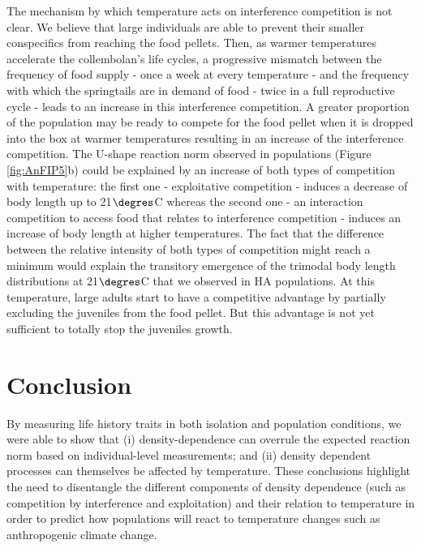 The mechanism by which temperature acts on interference competition is not
clear. We believe that large individuals are able to prevent their smaller
conspecifics from reaching the food pellets. Then, as warmer temperatures
accelerate the collembolan’s life cycles, a progressive mismatch between the
frequency of food supply - once a week at every temperature - and the frequency
with which the springtails are in demand of food - twice in a full reproductive
cycle \autocites{palevody1974a} - leads to an increase in this
interference competition.
A greater proportion of the population may be ready to compete for the food pellet
when it is dropped into the box at warmer temperatures resulting in an increase
of the interference competition. The U-shape reaction norm observed in
populations (Figure \ref{fig:AnFIP5}b) could be explained by an increase of both
types of competition with temperature: the first one - exploitative competition - induces
a decrease of body length up to 21$\degres$C whereas the second one - an interaction
competition to access food that relates to interference competition - induces an
increase of body length at higher temperatures. The fact that the difference
between the relative intensity of both types of competition might reach a
minimum would explain the transitory emergence of the trimodal body length
distributions at 21$\degres$C that we observed in HA populations. At this
temperature,
large adults start to have a competitive advantage by partially excluding the
juveniles from the food pellet. But this advantage is not yet sufficient to
totally stop the juveniles growth.


\section{Conclusion}

By measuring life history traits in both isolation and population conditions, we
were able to show that (i) density-dependence can overrule the expected reaction
norm based on individual-level measurements; and (ii) density dependent
processes can themselves be affected by temperature. These conclusions highlight
the need to disentangle the different components of density dependence (such as
competition by interference and exploitation) and their relation to temperature
in order to predict how populations will react to temperature changes such as
anthropogenic climate change.



















